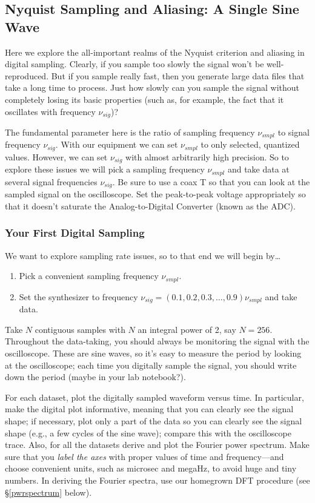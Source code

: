\documentclass[11pt]{article}
\begin{document}
\subsection{Nyquist Sampling and Aliasing: A Single Sine Wave} \label{nyquist}

    Here we explore the all-important realms of the Nyquist
criterion and aliasing in digital sampling.  Clearly, if you sample too
slowly the signal won't be well-reproduced.  But if you sample really
fast, then you generate large data files that take a long time to
process.  Just how slowly can you sample the signal without completely
losing its basic properties (such as, for example, the fact that it
oscillates with frequency $\nu_{sig}$)?

The fundamental parameter here is the ratio of sampling frequency
$\nu_{smpl}$ to signal frequency $\nu_{sig}$. With our equipment we can set
$\nu_{smpl}$ to only selected, quantized values. However, we can set
$\nu_{sig}$ with almost arbitrarily high precision. So to explore these
issues we will pick a sampling frequency $\nu_{smpl}$ and take data at
several signal frequencies $\nu_{sig}$.  Be sure to use a coax T so that
you can look at the sampled signal on the oscilloscope.  Set the
peak-to-peak voltage appropriately so that it doesn't saturate the
Analog-to-Digital Converter (known as the ADC).

\subsubsection{Your First Digital Sampling}
    We want to explore sampling rate issues, so to that end
we will begin by\dots
\begin{enumerate}
\item Pick a convenient sampling frequency $\nu_{smpl}$.  
\item Set the synthesizer to frequency $\nu_{sig} = (0.1, 0.2,
      0.3, \dots, 0.9) \nu_{smpl}$ and take data. 
\end{enumerate}

\noindent Take $N$ contiguous samples with $N$ an integral power of 2, say
$N=256$.  Throughout the data-taking, you should always be
monitoring the signal with the oscilloscope. These are sine waves, so
it's easy to measure the period by looking at the oscilloscope; each
time you digitally sample the signal, you should write down the period
(maybe in your lab notebook?).  

For each dataset, plot the digitally sampled waveform versus
time.  In particular, make the digital plot informative, meaning that
you can clearly see the signal shape; if necessary, plot only a part of
the data so you can clearly see the signal shape (e.g., a few cycles of
the sine wave); compare this with the oscilloscope trace.  Also, for all
the datasets derive and plot the Fourier power spectrum.  Make sure that
you {\it label the axes} with proper values of time and frequency---and
choose convenient units, such as microsec and megaHz, to avoid huge and
tiny numbers.  In deriving the Fourier spectra, use our homegrown DFT
procedure (see \S \ref{pwrspectrum} below).
\end{document}
